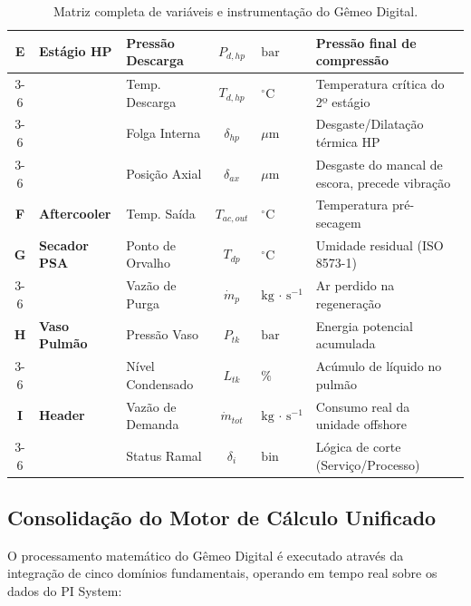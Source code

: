 \documentclass[12pt,a4paper]{article}
\numberwithin{equation}{section}
\numberwithin{table}{section}
\numberwithin{figure}{section}
\begin{document}
{\begin{table}[h!tbp]
{\begin{tabular}{c l l c l l}
			\textbf{E} & \textbf{Estágio HP} & Pressão Descarga & $P_{d,hp}$ & $\text{bar}$ & Pressão final de compressão \\ \cline{3-6}
			& & Temp. Descarga & $T_{d,hp}$ & $^{\circ}\text{C}$ & Temperatura crítica do 2º estágio \\ \cline{3-6}
			& & Folga Interna & $\delta_{hp}$ & $\mu\text{m}$ & Desgaste/Dilatação térmica HP \\ \cline{3-6}
			& & Posição Axial & $\delta_{ax}$ & $\mu\text{m}$ & Desgaste do mancal de escora, precede vibração \\
			\textbf{F} & \textbf{Aftercooler} & Temp. Saída & $T_{ac,out}$ & $^{\circ}\text{C}$ & Temperatura pré-secagem \\
			\textbf{G} & \textbf{Secador PSA} & Ponto de Orvalho & $T_{dp}$ & $^{\circ}\text{C}$ & Umidade residual (ISO 8573-1) \\ \cline{3-6} 
			& & Vazão de Purga & $\dot{m}_{p}$ & $\text{kg}\,\cdotp\,\text{s}^{-1}$ & Ar perdido na regeneração \\
			\textbf{H} & \textbf{Vaso Pulmão} & Pressão Vaso & $P_{tk}$ & $\text{bar}$ & Energia potencial acumulada \\ \cline{3-6} 
			& & Nível Condensado & $L_{tk}$ & $\%$ & Acúmulo de líquido no pulmão \\
			\textbf{I} & \textbf{Header} & Vazão de Demanda & $\dot{m}_{tot}$ & $\text{kg}\,\cdotp\,\text{s}^{-1}$ & Consumo real da unidade offshore \\ \cline{3-6} 
			& & Status Ramal & $\delta_{i}$ & $\text{bin}$ & Lógica de corte (Serviço/Processo) \\ \bottomrule
		\end{tabular}
	}
	\caption[Matriz de variáveis e instrumentação do Gêmeo Digital]{Matriz completa de variáveis e instrumentação do Gêmeo Digital.}
	\label{tab:18-1}
\end{table}

\subsection{Consolidação do Motor de Cálculo Unificado}

O processamento matemático do Gêmeo Digital é executado através da integração de cinco domínios fundamentais, operando em tempo real sobre os dados do PI System:

}
\end{document}
